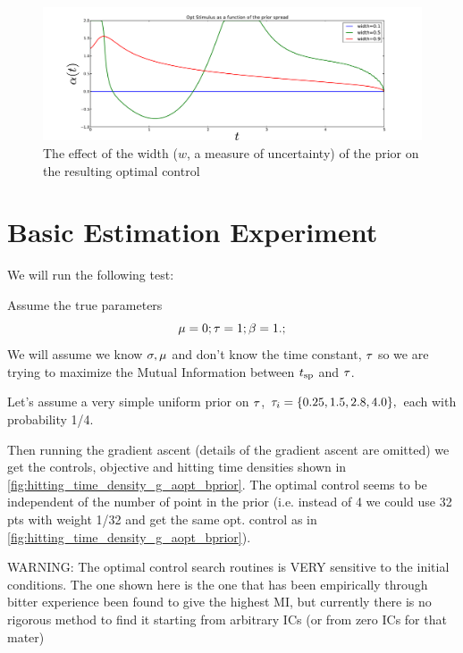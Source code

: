 \documentclass{article}
\begin{document}
\begin{figure}[h]
\begin{center} 
\includegraphics[width=\textwidth]
{Figs/FP_Adjoint/Effect_of_prior_spread.pdf} 
\caption[labelInTOC]{The effect of the width ($w$, a measure
of uncertainty) of the prior on the resulting optimal control}
\label{fig:effect_of_prior_width}
\end{center}
\end{figure}


\clearpage
\section{Basic Estimation Experiment}

We will run the following test:

Assume the true parameters $$
 {\mu } = 0; { \tau } = 1; {\beta} = 1.;
$$ We will assume we know ${\sigma }, {\mu }$ and don't know the time constant, ${ \tau }$ so we
are trying to maximize the Mutual Information between ${ t_{\textrm{sp} } }$ and ${ \tau }$.
 
Let's assume a very simple uniform prior on ${ \tau }$, ${ \tau }_i = \{0.25, 1.5, 2.8
, 4.0\},$ each with probability 1/4.

Then running the gradient ascent (details of the gradient ascent are omitted) we
get the controls, objective and hitting time densities shown in 
\cref{fig:hitting_time_density_g_aopt_bprior}. The optimal control seems to be
independent of the number of point in the prior (i.e. instead of 4 we could use
32 pts with weight 1/32 and get the same opt. control as in
\cref{fig:hitting_time_density_g_aopt_bprior}). 

{\color{red} 
WARNING: The optimal control search routines is VERY sensitive to the initial
conditions. The one shown here is the one that has been empirically through
bitter experience been found to give the highest MI, but currently there is no
rigorous method to find it starting from arbitrary ICs (or from zero ICs for
that mater) }
\end{document}
